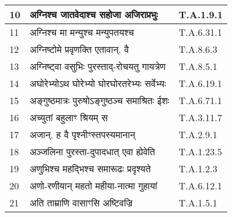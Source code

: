 \documentclass[17pt]{extarticle}
\begin{document}
\begin{longtable}{||p{0.4in}||p{4.9in}||p{0.9in}||}
    \hline
        
    10 & अग्निश्च जातवेदाश्च सहोजा अजिराप्रभुः & T.A.1.9.1       \\
    
    \hline
        
    11 & अग्निश्च मा मन्युश्च मन्युपतयश्च & T.A.6.31.1       \\
    
    \hline
        
    12 & अग्निष्टोमे प्रवृणक्ति एतावान्. वै & T.A.8.6.3       \\
    
    \hline
        
    13 & अग्निष्ट्वा वसुभिः पुरस्ताद्{-}रोचयतु गायत्रेण & T.A.8.5.1       \\
    
    \hline
        
    14 & अघोरेभ्योऽथ घोरेभ्यो घोरघोरतरेभ्यः सर्वेभ्यः & T.A.6.19.1       \\
    
    \hline
        
    15 & अङ्गुष्ठमात्रः पुरुषोऽङ्गुष्ठञ्च समाश्रितः ईशः & T.A.6.71.1       \\
    
    \hline
        
    16 & अच्युतां बहुलाꣳ श्रियम् स & T.A.3.11.7       \\
    
    \hline
        
    17 & अजान्. ह वै पृश्नीꣳस्तपस्यमानान् & T.A.2.9.1       \\
    
    \hline
        
    18 & अञ्जलिना पुरस्ता{-}दुपादधात् एवा ह्येवेति & T.A.1.23.5       \\
    
    \hline
        
    19 & अणुभिश्च महद्भिश्च समारूढः प्रदृश्यते & T.A.1.2.3       \\
    
    \hline
        
    20 & अणो{-}रणीयान् महतो महीया{-}नात्मा गुहायां & T.A.6.12.1       \\
    
    \hline
        
    21 & अति ताम्राणि वासाꣳसि अष्टिवज्रि & T.A.1.5.1       \\
    
    \hline
        

\end{longtable}
\end{document}
